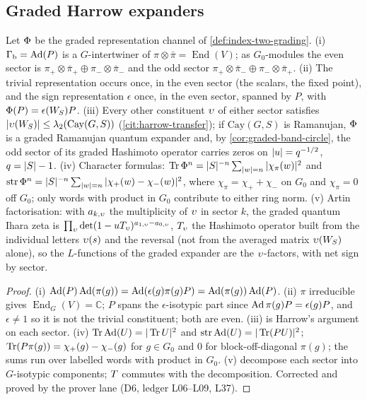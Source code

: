 \subsection{Graded Harrow expanders}

\begin{theorem}
\label{thm:graded-harrow}
Let $\Phi$ be the graded representation channel of \cref{def:index-two-grading}. (i) $\Gamma_{\mathrm b} =
\operatorname{Ad}(P)$ is a $G$-intertwiner of $\pi\otimes\bar\pi = \operatorname{End}(V)$; as $G_0$-modules the
even sector is $\pi_+\otimes\bar\pi_+\oplus\pi_-\otimes\bar\pi_-$ and the odd sector
$\pi_+\otimes\bar\pi_-\oplus\pi_-\otimes\bar\pi_+$. (ii) The trivial representation occurs once, in
the even sector (the scalars, the fixed point), and the sign representation $\epsilon$ once, in the
even sector, spanned by $P$, with $\Phi(P) = \epsilon(W_S)P$. (iii) Every other constituent $\upsilon$
of either sector satisfies $|\upsilon(W_S)|\le\lambda_2(\mathrm{Cay}(G,S))$ (\cref{cit:harrow-transfer});
if $\mathrm{Cay}(G,S)$ is Ramanujan, $\Phi$ is a graded Ramanujan quantum expander and, by
\cref{cor:graded-band-circle}, the odd sector of its graded Hashimoto operator carries zeros on
$|u| = q^{-1/2}$, $q = |S|-1$. (iv) Character formulas: $\operatorname{Tr}\Phi^n = |S|^{-n}\sum_{|w| = n}
|\chi_\pi(w)|^2$ and $\operatorname{str}\Phi^n = |S|^{-n}\sum_{|w| = n}|\chi_+(w)-\chi_-(w)|^2$, where $\chi_\pi =
\chi_++\chi_-$ on $G_0$ and $\chi_\pi = 0$ off $G_0$; only words with product in $G_0$ contribute to
either ring norm. (v) Artin factorisation: with $a_{k,\upsilon}$ the multiplicity of $\upsilon$ in sector $k$,
the graded quantum Ihara zeta is $\prod_\upsilon\det(1-uT_\upsilon)^{a_{1,\upsilon}-a_{0,\upsilon}}$,
$T_\upsilon$ the Hashimoto operator built from the individual letters $\upsilon(s)$ and the
reversal (not from the averaged matrix $\upsilon(W_S)$ alone), so the $L$-functions of the graded
expander are the $\upsilon$-factors, with net sign by sector.
\end{theorem}
\begin{proof}
(i) $\operatorname{Ad}(P)\operatorname{Ad}(\pi(g)) = \operatorname{Ad}(\epsilon(g)\pi(g)P) = \operatorname{Ad}(\pi(g))\operatorname{Ad}(P)$. (ii) $\pi$ irreducible gives
$\operatorname{End}_G(V) = \mathbb C$; $P$ spans the $\epsilon$-isotypic part since $\operatorname{Ad}\pi(g)P =
\epsilon(g)P$, and $\epsilon\ne1$ so it is not the trivial constituent; both are even. (iii) is
Harrow's argument on each sector. (iv) $\operatorname{Tr}\operatorname{Ad}(U) = |\operatorname{Tr} U|^2$ and $\operatorname{str}\operatorname{Ad}(U) = |\operatorname{Tr}(PU)|^2$;
$\operatorname{Tr}(P\pi(g)) = \chi_+(g)-\chi_-(g)$ for $g\in G_0$ and $0$ for block-off-diagonal $\pi(g)$; the
sums run over labelled words with product in $G_0$. (v) decompose each sector into $G$-isotypic
components; $T$ commutes with the decomposition. Corrected and proved by the prover lane (D6,
ledger L06--L09, L37).
\end{proof}

